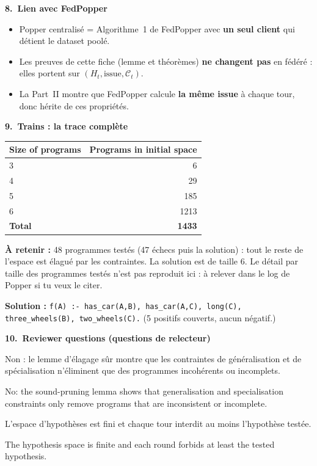 \documentclass[10pt]{article}
\newcommand{\titrebox}[2]{\needspace{10\baselineskip}\vspace{8pt}
  \begin{tcolorbox}[colback=marine, colframe=marine, arc=0pt, boxrule=0pt,
    top=4pt, bottom=4pt, left=8pt]
  \color{white}\Large\bfseries #1.~#2
  \end{tcolorbox}\vspace{2pt}}
\newcommand{\ce}[1]{\begin{pourquoi}\textbf{\textcolor{marine}{À retenir :}} #1\end{pourquoi}}
\newcommand{\st}[1]{\par\needspace{7\baselineskip}\vspace{5pt}{\normalsize\bfseries\textcolor{marine}{#1}}\par\vspace{2pt}}
\begin{document}
\titrebox{8}{Lien avec FedPopper}
\begin{itemize}
  \item Popper centralisé = Algorithme~1 de FedPopper avec \textbf{un seul client} qui détient le dataset poolé.
  \item Les preuves de cette fiche (lemme et théorèmes) \textbf{ne changent pas} en fédéré : elles portent sur $(H_t,\text{issue},\mathcal{C}_t)$.
  \item La Part~II montre que FedPopper calcule \textbf{la même issue} à chaque tour, donc hérite de ces propriétés.
\end{itemize}

\titrebox{9}{Trains : la trace complète}
\begin{tabular}{@{}l r@{}}
\textbf{Size of programs} & \textbf{Programs in initial space}\\\hline
3 & 6\\
4 & 29\\
5 & 185\\
6 & 1213\\
\textbf{Total} & \textbf{1433}\\
\end{tabular}
\ce{48 programmes testés (47 échecs puis la solution) : tout le reste de l'espace est élagué par les contraintes. La solution est de taille 6. Le détail par taille des programmes testés n'est pas reproduit ici : à relever dans le log de Popper si tu veux le citer.}
\textbf{Solution :} \texttt{f(A) :- has\_car(A,B), has\_car(A,C), long(C), three\_wheels(B), two\_wheels(C).}
(5 positifs couverts, aucun négatif.)

\titrebox{10}{Reviewer questions (questions de relecteur)}

\st{``Popper peut-il éliminer une solution par erreur ?''}
\begin{dire}
Non : le lemme d'élagage sûr montre que les contraintes de généralisation et de spécialisation n'éliminent que des programmes incohérents ou incomplets.
\end{dire}
\begin{direEN}
No: the sound-pruning lemma shows that generalisation and specialisation constraints only remove programs that are inconsistent or incomplete.
\end{direEN}

\st{``Pourquoi la boucle termine-t-elle ?''}
\begin{dire}
L'espace d'hypothèses est fini et chaque tour interdit au moins l'hypothèse testée.
\end{dire}
\begin{direEN}
The hypothesis space is finite and each round forbids at least the tested hypothesis.
\end{direEN}
\end{document}
